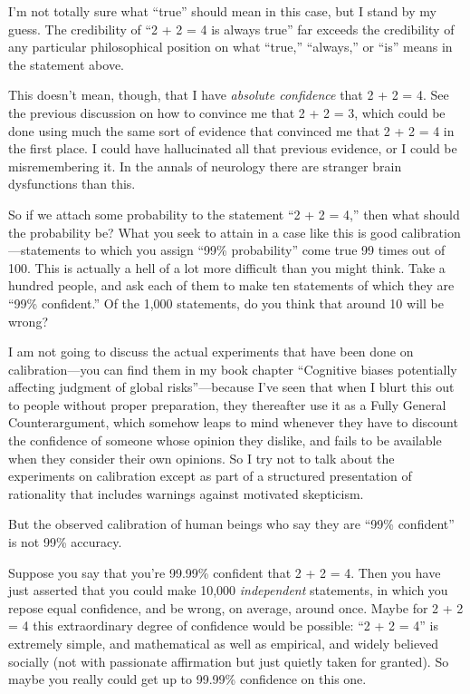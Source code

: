 {
 I'm not totally sure what
``true'' should mean in this case,
but I stand by my guess. The credibility of ``2 + 2 =
4 is always true'' far exceeds the credibility of any
particular philosophical position on what
``true,''
``always,'' or
``is'' means in the statement
above.}

{
 This doesn't mean, though, that I have
\textit{absolute confidence} that 2 + 2 = 4. See the previous
discussion on how to convince me that 2 + 2 = 3, which could be done
using much the same sort of evidence that convinced me that 2 + 2 = 4
in the first place. I could have hallucinated all that previous
evidence, or I could be misremembering it. In the annals of neurology
there are stranger brain dysfunctions than this.}

{
 So if we attach some probability to the statement
``2 + 2 = 4,'' then what should the
probability be? What you seek to attain in a case like this is good
calibration---statements to which you assign ``99\%
probability'' come true 99 times out of 100. This is
actually a hell of a lot more difficult than you might think. Take a
hundred people, and ask each of them to make ten statements of which
they are ``99\% confident.'' Of the
1,000 statements, do you think that around 10 will be wrong?}

{
 I am not going to discuss the actual experiments that have been
done on calibration---you can find them in my book chapter
``Cognitive biases potentially affecting judgment of
global risks''---because I've seen
that when I blurt this out to people without proper preparation, they
thereafter use it as a Fully General Counterargument, which somehow
leaps to mind whenever they have to discount the confidence of someone
whose opinion they dislike, and fails to be available when they
consider their own opinions. So I try not to talk about the experiments
on calibration except as part of a structured presentation of
rationality that includes warnings against motivated skepticism.}

{
 But the observed calibration of human beings who say they are
``99\% confident'' is not 99\%
accuracy.}

{
 Suppose you say that you're 99.99\% confident that
2 + 2 = 4. Then you have just asserted that you could make 10,000
\textit{independent} statements, in which you repose equal confidence,
and be wrong, on average, around once. Maybe for 2 + 2 = 4 this
extraordinary degree of confidence would be possible:
``2 + 2 = 4'' is extremely simple,
and mathematical as well as empirical, and widely believed socially
(not with passionate affirmation but just quietly taken for granted).
So maybe you really could get up to 99.99\% confidence on this one.}

